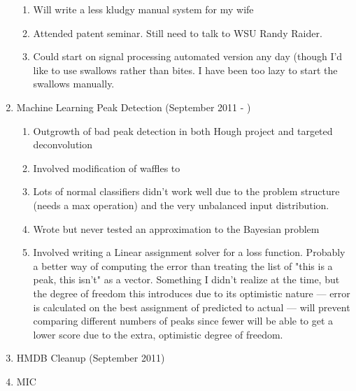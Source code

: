 \documentclass[english]{article}
\begin{document}
\begin{enumerate}
\begin{enumerate}
      \item Will write a less kludgy manual system for my wife
      \item Attended patent seminar. Still need to talk to WSU Randy Raider.
      \item Could start on signal processing automated version any day (though
            I'd like to use swallows rather than bites. I have been too lazy to
            start the swallows manually.
      \end{enumerate}
\item Machine Learning Peak Detection (September 2011 - )
      \begin{enumerate}
      \item Outgrowth of bad peak detection in both Hough project and
            targeted deconvolution
      \item Involved modification of waffles to 
      \item Lots of normal classifiers didn't work well due to the problem
            structure (needs a max operation) and the very unbalanced input
            distribution.
      \item Wrote but never tested an approximation to the Bayesian problem
      \item Involved writing a Linear assignment solver for a loss
            function. Probably a better way of computing the error than treating
            the list of "this is a peak, this isn't" as a vector. Something I
            didn't realize at the time, but the degree of freedom this introduces
            due to its optimistic nature --- error is calculated on the 
            best assignment of predicted to actual --- will prevent comparing
            different numbers of peaks since fewer will be able to get a lower
            score due to the extra, optimistic degree of freedom.
      \end{enumerate}
\item HMDB Cleanup (September 2011)
\item MIC
\end{enumerate}
\end{document}
